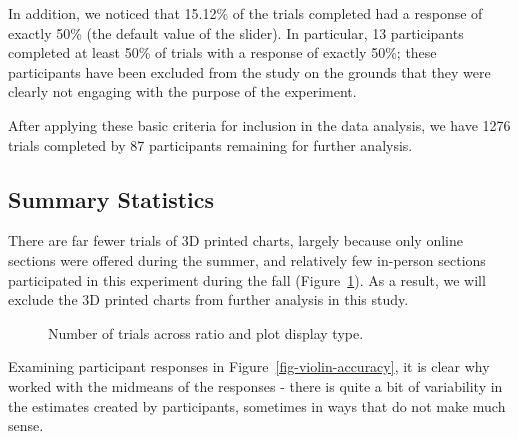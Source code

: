\documentclass[runningheads
]{llncs}
\begin{document}
In addition, we noticed that 15.12\% of the trials completed had a
response of exactly 50\% (the default value of the slider). In
particular, 13 participants completed at least 50\% of trials with a
response of exactly 50\%; these participants have been excluded from the
study on the grounds that they were clearly not engaging with the
purpose of the experiment.

After applying these basic criteria for inclusion in the data analysis,
we have 1276 trials completed by 87 participants remaining for further
analysis.

\subsection{Summary Statistics}\label{summary-statistics}

There are far fewer trials of 3D printed charts, largely because only
online sections were offered during the summer, and relatively few
in-person sections participated in this experiment during the fall
(Figure~\ref{fig-summary}). As a result, we will exclude the 3D printed
charts from further analysis in this study.

\begin{figure}


\caption{\label{fig-summary}Number of trials across ratio and plot
display type.}

\end{figure}%

Examining participant responses in Figure~\ref{fig-violin-accuracy}, it
is clear why \textcite{clevelandGraphicalPerceptionTheory1984} worked
with the midmeans of the responses - there is quite a bit of variability
in the estimates created by participants, sometimes in ways that do not
make much sense.
\end{document}
